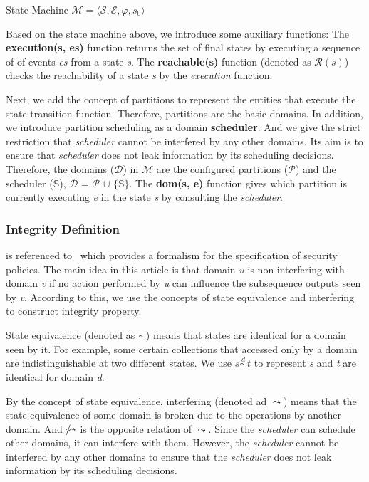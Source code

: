 \documentclass[runningheads]{llncs}
\makeatletter
\newcommand{\equidom}[3]{{#1}\stackrel{#2}{\sim}{#3}}
\newcommand{\superimpose}[2]
	{{\ooalign{$#1\@firstoftwo#2$\cr\hfil$#1\@secondoftwo#2$\hfil\cr}}}
\newcommand{\interf}{\leadsto}
\newcommand{\ninterf}{\mathrel{\mathpalette\superimpose{{\slash}{\leadsto}}}}
\makeatother
\begin{document}
\begin{definition} {State Machine} $\mathcal{M} = \langle \mathcal{S}, \mathcal{E}, \varphi, s_0 \rangle$
\end{definition}

Based on the state machine above, we introduce some auxiliary functions: The \textbf{execution(s, es)} function returns the set of final states by executing a sequence of of events \textsl{es} from a state \textsl{s}. The \textbf{reachable(s)} function (denoted as $\mathcal{R}(s)$) checks the reachability of a state \textsl{s} by the \textsl{execution} function.

Next, we add the concept of partitions to represent the entities that execute the state-transition function. Therefore, partitions are the basic domains. In addition, we introduce partition scheduling as a domain \textbf{scheduler}. And we give the strict restriction that \textsl{scheduler} cannot be interfered by any other domains. Its aim is to ensure that \textsl{scheduler} does not leak information by its scheduling decisions. Therefore, the domains ($\mathcal{D}$) in $\mathcal{M}$ are the configured partitions ($\mathcal{P}$) and the scheduler ($\mathbb{S}$), $\mathcal{D}$ = $\mathcal{P}$ $\cup$ $\lbrace$$\mathbb{S}$$\rbrace$. The \textbf{dom(s, e)} function gives which partition is currently executing \textsl{e} in the state \textsl{s} by consulting the \textsl{scheduler}.

\subsubsection{Integrity Definition} is referenced to~\cite{reg_noninterference} which provides a formalism for the specification of security policies. The main idea in this article is that domain \textsl{u} is non-interfering with domain \textsl{v} if no action performed by \textsl{u} can influence the subsequence outputs seen by \textsl{v}. According to this, we use the concepts of state equivalence and interfering to construct integrity property.

State equivalence (denoted as $\sim$) means that states are identical for a domain seen by it. For example, some certain collections that accessed only by a domain are indistinguishable at two different states. We use $\equidom{s}{d}{t}$ to represent \textsl{s} and \textsl{t} are identical for domain \textsl{d}.

By the concept of state equivalence, interfering (denoted ad $\interf$) means that the state equivalence of some domain is broken due to the operations by another domain. And $\ninterf$ is the opposite relation of $\interf$. Since the \textsl{scheduler} can schedule other domains, it can interfere with them. However, the \textsl{scheduler} cannot be interfered by any other domains to ensure that the \textsl{scheduler} does not leak information by its scheduling decisions.
\end{document}
